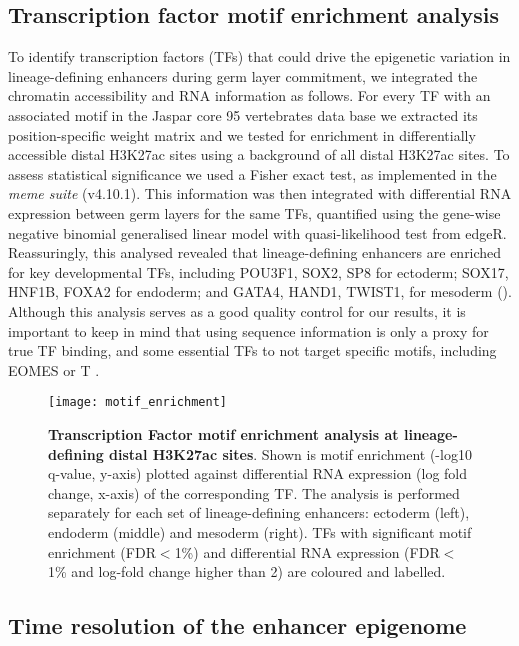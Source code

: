 \subsection{Transcription factor motif enrichment analysis}

To identify transcription factors (TFs) that could drive the epigenetic variation in lineage-defining enhancers during germ layer commitment, we integrated the chromatin accessibility and RNA information as follows. For every TF with an associated motif in the Jaspar core 95 vertebrates data base we extracted its position-specific weight matrix and we tested for enrichment in differentially accessible distal H3K27ac sites using a background of all distal H3K27ac sites. To assess statistical significance we used a Fisher exact test, as implemented in the \textit{meme suite} (v4.10.1). This information was then integrated with differential RNA expression between germ layers for the same TFs, quantified using the gene-wise negative binomial generalised linear model with quasi-likelihood test from edgeR. Reassuringly, this analysed revealed that lineage-defining enhancers are enriched for key developmental TFs, including POU3F1, SOX2, SP8 for ectoderm; SOX17, HNF1B, FOXA2 for endoderm; and GATA4, HAND1, TWIST1, for mesoderm ().\\
Although this analysis serves as a good quality control for our results, it is important to keep in mind that using sequence information is only a proxy for true TF binding, and some essential TFs to not target specific motifs, including EOMES or T \cite{Tosic2019}.

\begin{figure}[H]
	\centering
	\texttt{[image: motif\_enrichment]}
	\caption[]{
	\textbf{Transcription Factor motif enrichment analysis at lineage-defining distal H3K27ac sites}. Shown is motif enrichment (-log10 q-value, y-axis) plotted against differential RNA expression (log fold change, x-axis) of the corresponding TF. The analysis is performed separately for each set of lineage-defining enhancers: ectoderm (left), endoderm (middle) and mesoderm (right). TFs with significant motif enrichment (FDR$<$1\%) and differential RNA expression (FDR$<$1\% and log-fold change higher than 2) are coloured and labelled. }
	\label{fig:motif_enrichment}
\end{figure}


\subsection{Time resolution of the enhancer epigenome}

